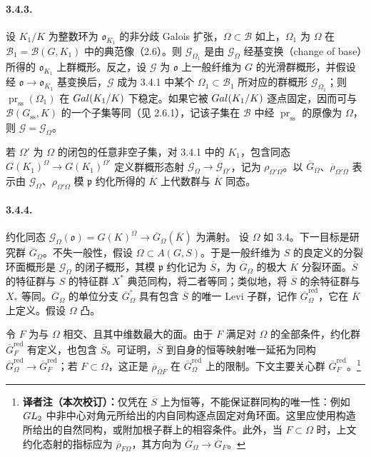 \paragraph*{3.4.3.}设 $K_1/K$ 为整数环为 $\mathfrak o_{K_1}$ 的非分歧 Galois 扩张，$\Omega\subset\mathscr B$ 如上，$\Omega_1$ 为 $\Omega$ 在 $\mathscr B_1=\mathscr B(G,K_1)$ 中的典范像（2.6）。则 $\mathscr G_{\Omega_1}$ 是由 $\mathscr G_\Omega$ 经基变换（change of base）所得的 $\mathfrak o_{K_1}$ 上群概形。反之，设 $\mathscr G$ 为 $\mathfrak o$ 上一般纤维为 $G$ 的光滑群概形，并假设经 $\mathfrak o\to\mathfrak o_{K_1}$ 基变换后，$\mathscr G$ 成为 3.4.1 中某个 $\Omega_1\subset\mathscr B_1$ 所对应的群概形 $\mathscr G_{\Omega_1}$；则 $\operatorname{pr}_{\mathrm{ss}}(\Omega_1)$ 在 $Gal(K_1/K)$ 下稳定。如果它被 $Gal(K_1/K)$ 逐点固定，因而可与 $\mathscr B(G_{\mathrm{ss}},K)$ 的一个子集等同（见 2.6.1），记该子集在 $\mathscr B$ 中经 $\operatorname{pr}_{\mathrm{ss}}$ 的原像为 $\Omega$，则 $\mathscr G=\mathscr G_\Omega$。

若 $\Omega'$ 为 $\Omega$ 的闭包的任意非空子集，对 3.4.1 中的 $K_1$，包含同态 $G(K_1)^\Omega\to G(K_1)^{\Omega'}$ 定义群概形态射 $\mathscr G_\Omega\to\mathscr G_{\Omega'}$，记为 $\rho_{\Omega'\Omega}$。以 $\overline G_\Omega$、$\overline\rho_{\Omega'\Omega}$ 表示由 $\mathscr G_\Omega$、$\rho_{\Omega'\Omega}$ 模 $\mathfrak p$ 约化所得的 $\overline K$ 上代数群与 $\overline K$ 同态。

\paragraph*{3.4.4.}约化同态 $\mathscr G_\Omega(\mathfrak o)=G(K)^\Omega\to\overline G_\Omega(\overline K)$ 为满射。
设 $\Omega$ 如 3.4。下一目标是研究群 $\overline G_\Omega$。不失一般性，假设 $\Omega\subset A(G,S)$。于是一般纤维为 $S$ 的良定义的分裂环面概形是 $\mathscr G_\Omega$ 的闭子概形，其模 $\mathfrak p$ 约化记为 $\overline S$，为 $\overline G_\Omega$ 的极大 $\overline K$ 分裂环面。$\overline S$ 的特征群与 $S$ 的特征群 $X^*$ 典范同构，将二者等同；类似地，将 $\overline S$ 的余特征群与 $X_*$ 等同。$\overline G_\Omega$ 的单位分支 $\overline G_\Omega^\circ$ 具有包含 $\overline S$ 的唯一 Levi 子群，记作 $\overline G_\Omega^{\mathrm{red}}$，它在 $\overline K$ 上定义。假设 $\Omega$ 凸。

令 $F$ 为与 $\Omega$ 相交、且其中维数最大的面。由于 $F$ 满足对 $\Omega$ 的全部条件，约化群 $\overline G_F^{\mathrm{red}}$ 有定义，也包含 $\overline S$。可证明，$\overline S$ 到自身的恒等映射唯一延拓为同构 $\overline G_\Omega^{\mathrm{red}}\to\overline G_F^{\mathrm{red}}$；若 $F\subset\Omega$，这正是 $\overline\rho_{\Omega F}$ 在 $\overline G_\Omega^{\mathrm{red}}$ 上的限制。下文主要关心群 $\overline G_F^{\mathrm{red}}$。\footnote{\textbf{译者注（本次校订）：}仅凭在 $\overline S$ 上为恒等，不能保证群同构的唯一性：例如 $GL_2$ 中非中心对角元所给出的内自同构逐点固定对角环面。这里应使用构造所给出的自然同构，或附加根子群上的相容条件。此外，当 $F\subset\Omega$ 时，上文约化态射的指标应为 $\overline\rho_{F\Omega}$，其方向为 $\overline G_\Omega\to\overline G_F$。}

